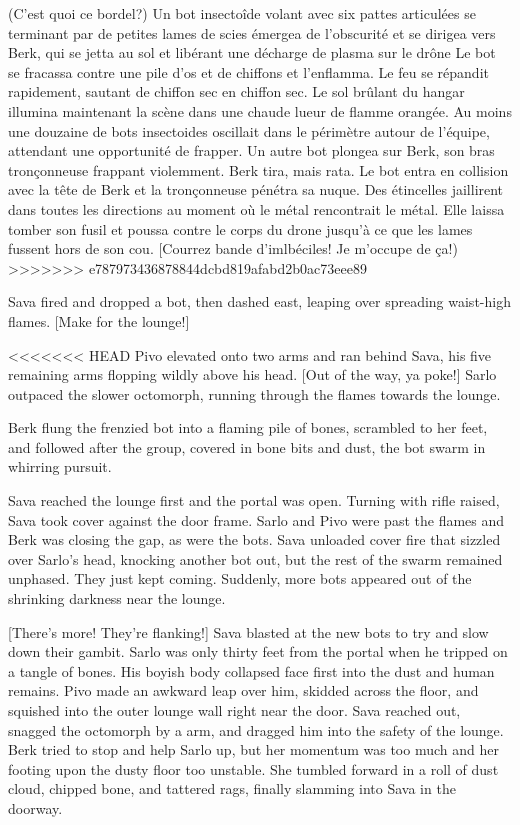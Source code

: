 (C'est quoi ce bordel?) Un bot insectoîde volant avec six pattes articulées se terminant par de petites lames de scies émergea de l'obscurité et se dirigea vers Berk, qui se jetta au sol et libérant une décharge de plasma sur le drône Le bot se fracassa contre une pile d'os et de chiffons et l'enflamma. Le feu se répandit rapidement, sautant de chiffon sec en chiffon sec. Le sol brûlant du hangar illumina maintenant la scène dans une chaude lueur de flamme orangée. Au moins une douzaine de bots insectoides oscillait dans le périmètre autour de l'équipe, attendant une opportunité de frapper. Un autre bot plongea sur Berk, son bras tronçonneuse frappant violemment. Berk tira, mais rata. Le bot entra en collision avec la tête de Berk et la tronçonneuse pénétra sa nuque. Des étincelles jaillirent dans toutes les directions au moment où le métal rencontrait le métal. Elle laissa tomber son fusil et poussa contre le corps du drone jusqu'à ce que les lames fussent hors de son cou. [Courrez bande d'imlbéciles! Je m'occupe de ça!) 
>>>>>>> e787973436878844dcbd819afabd2b0ac73eee89

Sava fired and dropped a bot, then dashed east, leaping over spreading waist-high flames. [Make for the lounge!] 

<<<<<<< HEAD
Pivo elevated onto two arms and ran behind Sava, his five remaining arms flopping wildly above his head. [Out of the way, ya poke!] Sarlo outpaced the slower octomorph, running through the flames towards the lounge. 

Berk flung the frenzied bot into a flaming pile of bones, scrambled to her feet, and followed after the group, covered in bone bits and dust, the bot swarm in whirring pursuit. 

Sava reached the lounge first and the portal was open. Turning with rifle raised, Sava took cover against the door frame. Sarlo and Pivo were past the flames and Berk was closing the gap, as were the bots. Sava unloaded cover fire that sizzled over Sarlo's head, knocking another bot out, but the rest of the swarm remained unphased. They just kept coming. Suddenly, more bots appeared out of the shrinking darkness near the lounge. 

[There's more! They're flanking!] Sava blasted at the new bots to try and slow down their gambit. Sarlo was only thirty feet from the portal when he tripped on a tangle of bones. His boyish body collapsed face first into the dust and human remains. Pivo made an awkward leap over him, skidded across the floor, and squished into the outer lounge wall right near the door. Sava reached out, snagged the octomorph by a arm, and dragged him into the safety of the lounge. Berk tried to stop and help Sarlo up, but her momentum was too much and her footing upon the dusty floor too unstable. She tumbled forward in a roll of dust cloud, chipped bone, and tattered rags, finally slamming into Sava in the doorway. 

